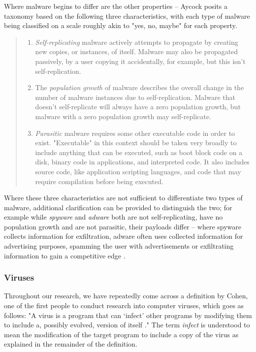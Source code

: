 Where malware begins to differ are the other properties -- Aycock posits a taxonomy based on the following three 
characteristics, with each type of malware being classified on a scale roughly akin to "yes, no, maybe"
for each property.
\begin{quote}
  \begin{enumerate}
    \item \emph{Self-replicating} malware actively attempts to propagate by creating new copies, or instances, 
      of itself. Malware may also be propagated passively, by a user copying it accidentally, for example, 
      but this isn't self-replication.
    \item The \emph{population growth} of malware describes the overall change in the number of malware instances due to
      self-replication. Malware that doesn't self-replicate will always have a zero population growth, but malware with a
      zero population growth may self-replicate.
    \item \emph{Parasitic} malware requires some other executable code in order to exist. "Executable" in this context 
      should be taken very broadly to include anything that can be executed, such as boot block code on a disk, binary 
      code in applications, and interpreted code. It also includes source code, like application scripting languages,
      and code that may require compilation before being executed.
  \end{enumerate}
  \cite[p.~11-12]{aycock-book}
\end{quote}
Where these three characteristics are not sufficient to differentiate two types of malware, additional clarification can
be provided to distinguish the two; for example while \emph{spyware} and \emph{adware} both are not self-replicating,
have no population growth and are not parasitic, their payloads differ -- where spyware collects information for
exfiltration, adware often uses collected information for advertising purposes, spamming the user with advertisements
or exfiltrating information to gain a competitive edge \cite[p.~16-17]{aycock-book}. 

\subsubsection{Viruses}
Throughout our research, we have repeatedly come across a definition by Cohen, one of the first 
people to conduct research into computer viruses, which goes as follows: "A virus is a program that can ‘infect’ other 
programs by modifying them to include a, possibly evolved, version of itself \cite{cohen-virus-course}." The term
\emph{infect} is understood to mean the modification of the target program to include a copy of the virus as explained
in the remainder of the definition. 

